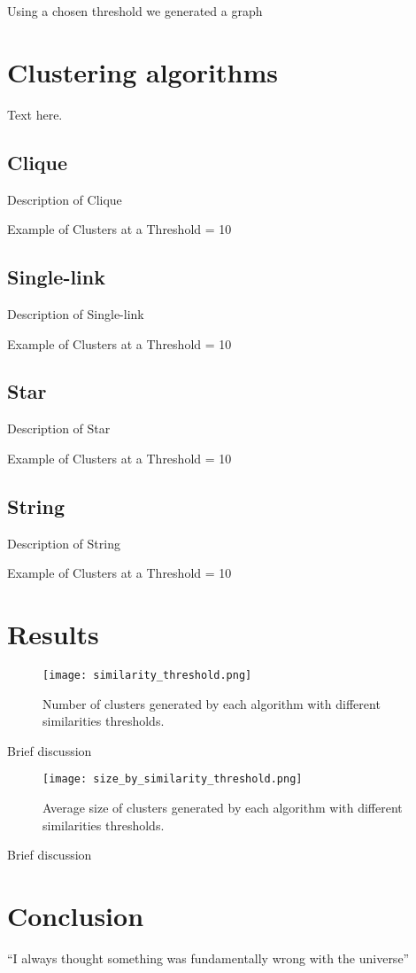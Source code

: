 \documentclass{article}
\begin{document}
Using a chosen threshold we generated a graph

\section{Clustering algorithms}
Text here.

\subsection{Clique}
Description of Clique

Example of Clusters at a Threshold = 10

\subsection{Single-link}
Description of Single-link

Example of Clusters at a Threshold = 10

\subsection{Star}
Description of Star

Example of Clusters at a Threshold = 10

\subsection{String}
Description of String

Example of Clusters at a Threshold = 10

\section{Results}

\begin{figure}[h!]
    \centering
    \texttt{[image: similarity\_threshold.png]}
    \caption{Number of clusters generated by each algorithm with different similarities thresholds.}
    \label{fig:similarity_threshold}
\end{figure}

Brief discussion

\begin{figure}[h!]
    \centering
    \texttt{[image: size\_by\_similarity\_threshold.png]}
    \caption{Average size of clusters generated by each algorithm with different similarities thresholds.}
    \label{fig:similarity_threshold}
\end{figure}

Brief discussion

\section{Conclusion}
``I always thought something was fundamentally wrong with the universe'' 



\end{document}
